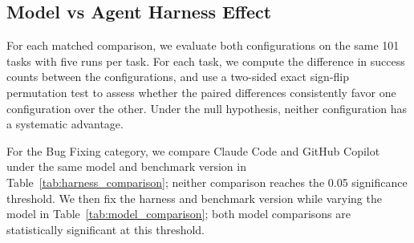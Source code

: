 \documentclass{article}
\begin{document}
\subsection{Model vs Agent Harness Effect}

For each matched comparison, we evaluate both configurations on the same 101 tasks with five runs per task. For each task, we compute the difference in success counts between the configurations, and use a two-sided exact sign-flip permutation test to assess whether the paired differences consistently favor one configuration over the other. Under the null hypothesis, neither configuration has a systematic advantage.

For the Bug Fixing category, we compare Claude Code and GitHub Copilot under the same model and benchmark version in Table~\ref{tab:harness_comparison}; neither comparison reaches the 0.05 significance threshold. We then fix the harness and benchmark version while varying the model in Table~\ref{tab:model_comparison}; both model comparisons are statistically significant at this threshold.

\begin{table}[t]
\vskip 0.05in
\begin{center}
\begin{small}
\end{small}
\end{center}
\caption{Matched harness comparisons on Bug Fixing with model and benchmark version fixed. Values are mean resolution rates.}
\label{tab:harness_comparison}
\vskip 0.1in
\end{table}

\begin{table}[t]
\vskip 0.05in
\begin{center}
\begin{small}
\end{small}
\end{center}
\caption{Matched model comparisons on Bug Fixing with harness and benchmark version fixed. Values are mean resolution rates.}
\label{tab:model_comparison}
\vskip 0.1in
\end{table}
\end{document}
